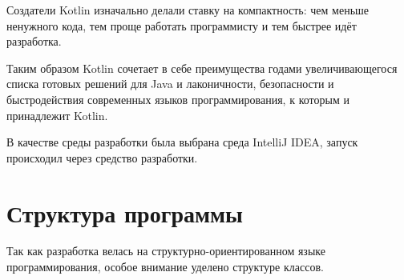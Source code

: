 Создатели Kotlin изначально делали ставку на компактность: чем меньше ненужного кода, тем проще работать программисту и тем быстрее идёт разработка.

Таким образом Kotlin сочетает в себе преимущества годами увеличивающегося списка готовых решений для Java и лаконичности, безопасности и быстродействия современных языков программирования, к которым и принадлежит Kotlin.

В качестве среды разработки была выбрана среда IntelliJ IDEA\cite{idea}, запуск происходил через средство разработки.

\section{Структура программы}

Так как разработка велась на структурно-ориентированном языке программирования, особое внимание уделено структуре классов.

